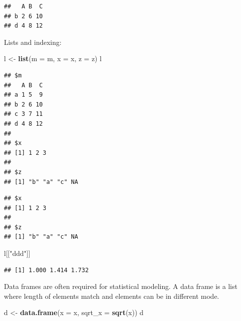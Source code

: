 \documentclass[12pt,]{book}
\newenvironment{Shaded}{\begin{snugshade}}{\end{snugshade}}
\newcommand{\DataTypeTok}[1]{\textcolor[rgb]{0.13,0.29,0.53}{#1}}
\newcommand{\DecValTok}[1]{\textcolor[rgb]{0.00,0.00,0.81}{#1}}
\newcommand{\KeywordTok}[1]{\textcolor[rgb]{0.13,0.29,0.53}{\textbf{#1}}}
\newcommand{\NormalTok}[1]{#1}
\newcommand{\OperatorTok}[1]{\textcolor[rgb]{0.81,0.36,0.00}{\textbf{#1}}}
\newcommand{\StringTok}[1]{\textcolor[rgb]{0.31,0.60,0.02}{#1}}
\begin{document}
\begin{verbatim}
##   A B  C
## b 2 6 10
## d 4 8 12
\end{verbatim}

Lists and indexing:

\begin{Shaded}
\begin{Highlighting}[]
\NormalTok{l <-}\StringTok{ }\KeywordTok{list}\NormalTok{(}\DataTypeTok{m =}\NormalTok{ m, }\DataTypeTok{x =}\NormalTok{ x, }\DataTypeTok{z =}\NormalTok{ z)}
\NormalTok{l}
\end{Highlighting}
\end{Shaded}

\begin{verbatim}
## $m
##   A B  C
## a 1 5  9
## b 2 6 10
## c 3 7 11
## d 4 8 12
## 
## $x
## [1] 1 2 3
## 
## $z
## [1] "b" "a" "c" NA
\end{verbatim}

\begin{Shaded}
\end{Shaded}

\begin{verbatim}
## $x
## [1] 1 2 3
## 
## $z
## [1] "b" "a" "c" NA
\end{verbatim}

\begin{Shaded}
\begin{Highlighting}[]
\NormalTok{l[[}\StringTok{"ddd"}\NormalTok{]]}
\end{Highlighting}
\end{Shaded}

\begin{verbatim}
## [1] 1.000 1.414 1.732
\end{verbatim}

Data frames are often required for statistical modeling.
A data frame is a list where length of elements match and elements
can be in different mode.

\begin{Shaded}
\begin{Highlighting}[]
\NormalTok{d <-}\StringTok{ }\KeywordTok{data.frame}\NormalTok{(}\DataTypeTok{x =}\NormalTok{ x, }\DataTypeTok{sqrt_x =} \KeywordTok{sqrt}\NormalTok{(x))}
\NormalTok{d}
\end{Highlighting}
\end{Shaded}
\end{document}
